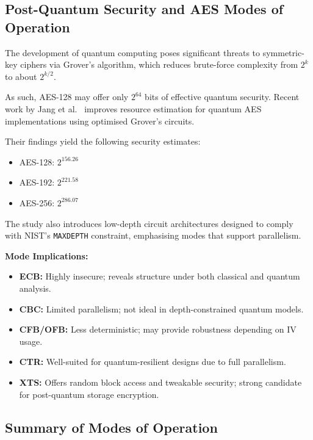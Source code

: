 \subsection{Post-Quantum Security and AES Modes of Operation}

The development of quantum computing poses significant threats to symmetric-key ciphers via Grover’s algorithm, 
which reduces brute-force complexity from $2^k$ to about $2^{k/2}$. 

\noindent As such, AES-128 may offer only $2^{64}$ bits of effective quantum security.
Recent work by Jang et al.~\cite{Jang2025} improves resource estimation for quantum AES implementations using optimised Grover’s circuits. \newline

\noindent Their findings yield the following security estimates:
\begin{itemize}
    \item AES-128: $2^{156.26}$
    \item AES-192: $2^{221.58}$
    \item AES-256: $2^{286.07}$
\end{itemize}

The study also introduces low-depth circuit architectures designed to comply with NIST’s \texttt{MAXDEPTH} constraint, 
emphasising modes that support parallelism.

\textbf{Mode Implications:}
\begin{itemize}
    \item \textbf{ECB:} Highly insecure; reveals structure under both classical and quantum analysis.
    \item \textbf{CBC:} Limited parallelism; not ideal in depth-constrained quantum models.
    \item \textbf{CFB/OFB:} Less deterministic; may provide robustness depending on IV usage.
    \item \textbf{CTR:} Well-suited for quantum-resilient designs due to full parallelism.
    \item \textbf{XTS:} Offers random block access and tweakable security; strong candidate for post-quantum storage encryption.
\end{itemize}

\subsection{Summary of Modes of Operation}

